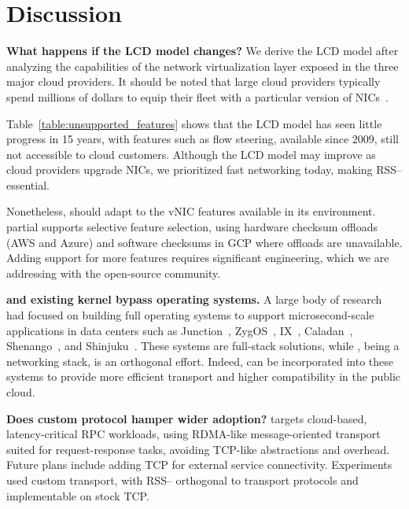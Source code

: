 \section{Discussion}
\label{sec:discussion}

\noindent \textbf{What happens if the LCD model changes?}
We derive the LCD model after analyzing the capabilities of the network virtualization layer exposed in the three major cloud providers.
It should be noted that large cloud providers typically spend millions of dollars to equip their fleet with a particular version of NICs~\cite{nic-purchase}. 

Table~\ref{table:unsupported_features} shows that the LCD model has seen little progress in 15 years, with features such as flow steering, available since 2009, still not accessible to cloud customers. Although the LCD model may improve as cloud providers upgrade NICs, we prioritized fast networking today, making RSS-- essential.


Nonetheless, \mt{} should adapt to the vNIC features available in its environment. \mt{} partial supports selective feature selection, using hardware checksum offloads (AWS and Azure) and software checksums in GCP where offloads are unavailable. Adding support for more features requires significant engineering, which we are addressing with the open-source community.



\vspace{0.5em}
\label{disc:fops}
\noindent \textbf{\mt{} and existing kernel bypass operating systems.}
A large body of research had focused on building full operating systems to support microsecond-scale applications in data centers such as Junction~\cite{junction:nsdi24}, ZygOS~\cite{zygos}, IX~\cite{belay2014ix}, Caladan~\cite{caladan}, Shenango~\cite{shenango}, and Shinjuku~\cite{shinjuku}. These systems are full-stack solutions, while \mt{}, being a networking stack, is an orthogonal effort. Indeed, \mt{} can be incorporated into these systems to provide more efficient transport and higher compatibility in the public cloud.

\vspace{0.5em}
\label{disc:custom_protocol}
\noindent \textbf{Does custom protocol hamper wider adoption?}
\mt{} targets cloud-based, latency-critical RPC workloads, using RDMA-like message-oriented transport suited for request-response tasks, avoiding TCP-like abstractions and overhead. Future plans include adding TCP for external service connectivity. Experiments used custom transport, with RSS-- orthogonal to transport protocols and implementable on stock TCP.